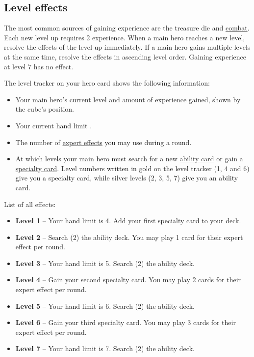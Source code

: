 \subsection*{\hypertarget{Level}{Level effects}}
The most common sources of gaining experience are the treasure die and \hyperlink{Combatexperience}{combat}.
Each new level up requires 2 experience.
When a main hero reaches a new level, resolve the effects of the level up immediately.
If a main hero gains multiple levels at the same time, resolve the effects in ascending level order.
Gaining experience at level 7 has no effect.\par
The level tracker on your hero card shows the following information:
\begin{itemize}
\item Your main hero’s current level and amount of experience gained, shown by the cube's position.
\item Your current hand limit .
\item The number of \hyperlink{Ability}{expert effects}  you may use during a round.
\item At which levels your main hero must search for a new \hyperlink{Ability}{ability card} or gain a \hyperlink{Specialty}{specialty card}.
Level numbers written in gold on the level tracker (1, 4 and 6) give you a specialty card, while silver levels (2, 3, 5, 7) give you an ability card.
\end{itemize}
List of all effects:
\begin{itemize}
\item \textbf{Level 1} – Your hand limit is 4.
Add your first specialty card to your deck.
\item \textbf{Level 2} – Search (2) the ability deck.
You may play 1 card for their expert effect per round.
\item \textbf{Level 3} – Your hand limit is 5.
Search (2) the ability deck.
\item \textbf{Level 4} – Gain your second specialty card.
You may play 2 cards for their expert effect per round.
\item \textbf{Level 5} – Your hand limit is 6.
Search (2) the ability deck.
\item \textbf{Level 6} – Gain your third specialty card.
You may play 3 cards for their expert effect per round.
\item \textbf{Level 7} – Your hand limit is 7.
Search (2) the ability deck.
\end{itemize}
